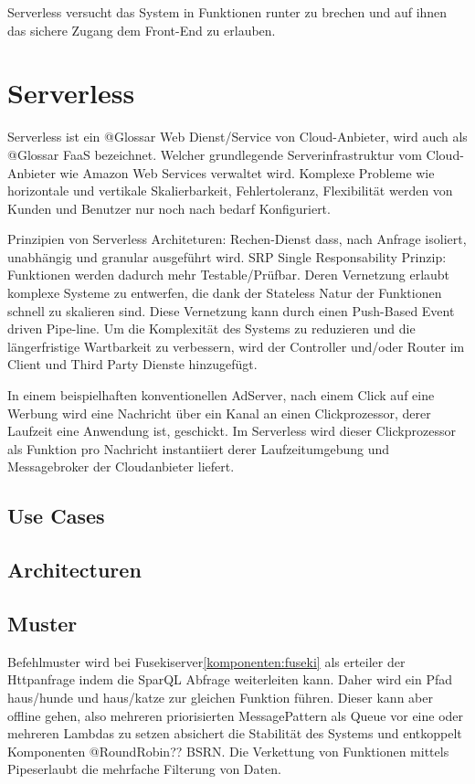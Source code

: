 \documentclass[
12pt,
english,
ngerman,
headsepline,
twoside,
openright,
numbers=noenddot,version=first
]{scrreprt}
\begin{document}
Serverless versucht das System in Funktionen runter zu brechen und auf ihnen das sichere Zugang dem Front-End zu erlauben.

\section{Serverless}
\label{sec:serverless}

Serverless ist ein @Glossar Web Dienst/Service von Cloud-Anbieter, wird auch als @Glossar FaaS bezeichnet. Welcher grundlegende Serverinfrastruktur vom Cloud-Anbieter wie Amazon Web Services verwaltet wird. Komplexe Probleme wie horizontale und vertikale Skalierbarkeit, Fehlertoleranz, Flexibilität werden von Kunden und Benutzer nur noch nach bedarf Konfiguriert.


Prinzipien von Serverless Architeturen: \cite{sbarski2017serverless}
Rechen-Dienst dass, nach Anfrage isoliert, unabhängig und granular ausgeführt wird.
SRP Single Responsability Prinzip: Funktionen werden dadurch mehr Testable/Prüfbar. Deren Vernetzung erlaubt komplexe Systeme zu entwerfen, die dank der Stateless Natur der Funktionen schnell zu skalieren sind.
Diese Vernetzung kann durch einen Push-Based Event driven Pipe-line.
Um die Komplexität des Systems zu reduzieren und die längerfristige Wartbarkeit zu verbessern, wird der Controller und/oder Router im Client und Third Party Dienste hinzugefügt.

In einem beispielhaften konventionellen AdServer, nach einem Click auf eine Werbung wird eine Nachricht über ein Kanal an einen Clickprozessor, derer Laufzeit eine Anwendung ist, geschickt. Im Serverless wird dieser Clickprozessor als Funktion pro Nachricht instantiiert derer Laufzeitumgebung und Messagebroker der Cloudanbieter liefert.

\subsection{Use Cases}

\subsection{Architecturen}

\subsection{Muster}

Befehlmuster wird bei Fusekiserver\ref{komponenten:fuseki} als erteiler der Httpanfrage indem die SparQL Abfrage weiterleiten kann. Daher wird ein Pfad haus/hunde und haus/katze zur gleichen Funktion führen.
Dieser kann aber offline gehen, also mehreren priorisierten MessagePattern als Queue vor eine oder mehreren Lambdas zu setzen absichert die Stabilität des Systems und entkoppelt Komponenten @RoundRobin?? BSRN.
Die Verkettung von Funktionen mittels \glqq Pipes\grqq erlaubt die mehrfache Filterung von Daten.
\end{document}
